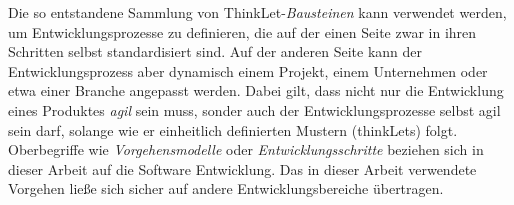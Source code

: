 Die so entstandene Sammlung von ThinkLet-\textit{Bausteinen} kann verwendet
werden, um Entwicklungsprozesse zu definieren, die auf der einen Seite zwar in
ihren Schritten selbst standardisiert sind. Auf der anderen Seite kann der
Entwicklungsprozess aber dynamisch einem Projekt, einem Unternehmen oder etwa
einer Branche angepasst werden. Dabei gilt, dass nicht nur die Entwicklung eines
Produktes \textit{agil} sein muss, sonder
auch der Entwicklungsprozesse selbst \gls{agil} sein darf, solange wie er
einheitlich definierten Mustern (thinkLets) folgt.
\\

Oberbegriffe wie \textit{Vorgehensmodelle} oder \textit{Entwicklungsschritte}
beziehen sich in dieser Arbeit auf die Software Entwicklung. Das in dieser
Arbeit verwendete Vorgehen ließe sich sicher auf andere Entwicklungsbereiche
übertragen.


